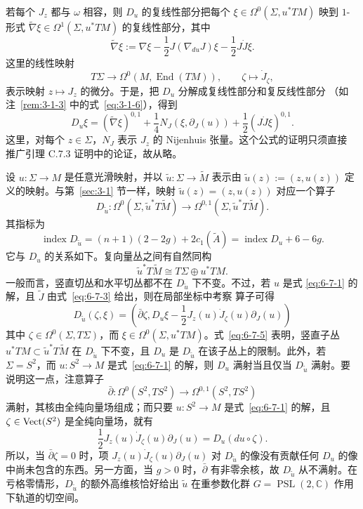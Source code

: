 \begin{remark}\label{rem:6-7-4}
若每个 $J_z$ 都与 $\omega$ 相容，则 $D_u$ 的复线性部分把每个
$\xi\in\Omega^0(\Sigma,u^*TM)$ 映到 $1$-形式
$\widetilde\nabla\xi\in\Omega^1(\Sigma,u^*TM)$ 的复线性部分，其中
\[
  \widetilde\nabla\xi
  :=\nabla\xi-\frac12J(\nabla_{du}J)\xi-\frac12J\dot J\xi.
\]
这里的线性映射
\[
  T\Sigma\longrightarrow\Omega^0(M,\operatorname{End}(TM)),
  \qquad \zeta\longmapsto\dot J_\zeta,
\]
表示映射 $z\mapsto J_z$ 的微分。于是，把 $D_u$ 分解成复线性部分和复反线性部分
（如注~\ref{rem:3-1-3} 中的式~\eqref{eq:3-1-6}），得到
\[
  D_u\xi=(\widetilde\nabla\xi)^{0,1}
    +\frac14N_J(\xi,\partial_J(u))
    +\frac12(J\dot J\xi)^{0,1}.
\]
这里，对每个 $z\in\Sigma$，$N_J$ 表示 $J_z$ 的 Nijenhuis 张量。这个公式的证明只须直接
推广引理 C.7.3 证明中的论证，故从略。
\end{remark}

\begin{remark}\label{rem:6-7-5}
设 $u:\Sigma\to M$ 是任意光滑映射，并以
$\widetilde u:\Sigma\to\widetilde M$ 表示由
$\widetilde u(z):=(z,u(z))$ 定义的映射。与第~\ref{sec:3-1} 节一样，映射
$\widetilde u(z)=(z,u(z))$ 对应一个算子
\[
  D_{\widetilde u}:\Omega^0(\Sigma,\widetilde u^*T\widetilde M)
  \longrightarrow\Omega^{0,1}(\Sigma,\widetilde u^*T\widetilde M).
\]
其指标为
\[
  \operatorname{index}D_{\widetilde u}
  =(n+1)(2-2g)+2c_1(\widetilde A)
  =\operatorname{index}D_u+6-6g.
\]
它与 $D_u$ 的关系如下。复向量丛之间有自然同构
\[
  \widetilde u^*T\widetilde M\cong T\Sigma\oplus u^*TM.
\]
一般而言，竖直切丛和水平切丛都不在 $D_{\widetilde u}$ 下不变。不过，若 $u$ 是式
\eqref{eq:6-7-1} 的解，且 $\widetilde J$ 由式~\eqref{eq:6-7-3} 给出，则在局部坐标中考察
算子可得
\begin{equation}\label{eq:6-7-5}
  D_{\widetilde u}(\zeta,\xi)
  =\left(\bar\partial\zeta,
    D_u\xi-\frac12J_z(u)\dot J_\zeta(u)\partial_J(u)\right)
\end{equation}
其中 $\zeta\in\Omega^0(\Sigma,T\Sigma)$，而
$\xi\in\Omega^0(\Sigma,u^*TM)$。式~\eqref{eq:6-7-5} 表明，竖直子丛
$u^*TM\subset\widetilde u^*T\widetilde M$ 在 $D_{\widetilde u}$ 下不变，且 $D_u$ 是
$D_{\widetilde u}$ 在该子丛上的限制。此外，若 $\Sigma=S^2$，而
$u:S^2\to M$ 是式~\eqref{eq:6-7-1} 的解，则 $D_u$ 满射当且仅当
$D_{\widetilde u}$ 满射。要说明这一点，注意算子
\[
  \bar\partial:\Omega^0(S^2,TS^2)\longrightarrow\Omega^{0,1}(S^2,TS^2)
\]
满射，其核由全纯向量场组成；而只要 $u:S^2\to M$ 是式~\eqref{eq:6-7-1} 的解，且
$\zeta\in\operatorname{Vect}(S^2)$ 是全纯向量场，就有
\[
  \frac12J_z(u)\dot J_\zeta(u)\partial_J(u)=D_u(du\circ\zeta).
\]
所以，当 $\bar\partial\zeta=0$ 时，项
$J_z(u)\dot J_\zeta(u)\partial_J(u)$ 对 $D_{\widetilde u}$ 的像没有贡献任何
$D_u$ 的像中尚未包含的东西。另一方面，当 $g>0$ 时，$\bar\partial$ 有非零余核，故
$D_{\widetilde u}$ 从不满射。在亏格零情形，$D_{\widetilde u}$ 的额外高维核恰好给出
$\widetilde u$ 在重参数化群 $G=\operatorname{PSL}(2,\mathbb C)$ 作用下轨道的切空间。
\end{remark}

